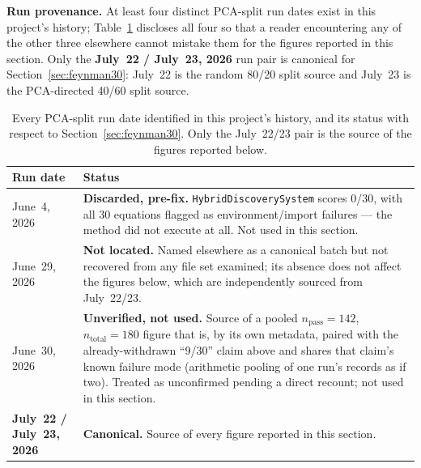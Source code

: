 \documentclass[twoside,11pt]{article}
\begin{document}
\textbf{Run provenance.}\quad
At least four distinct PCA-split run dates exist in this project's history;
Table~\ref{tab:provenance} discloses all four so that a reader encountering
any of the other three elsewhere cannot mistake them for the figures reported
in this section. Only the \textbf{July~22 / July~23, 2026} run pair is
canonical for Section~\ref{sec:feynman30}: July~22 is the random 80/20 split
source and July~23 is the PCA-directed 40/60 split source.

\begin{table}[h]
\centering
\caption{Every PCA-split run date identified in this project's history, and
  its status with respect to Section~\ref{sec:feynman30}. Only the
  July~22/23 pair is the source of the figures reported below.}
\label{tab:provenance}
\small
\begin{tabular}{lp{9.3cm}}
\toprule
Run date & Status \\
\midrule
June~4, 2026 & \textbf{Discarded, pre-fix.} \texttt{HybridDiscoverySystem}
scores 0/30, with all 30 equations flagged as environment/import failures
--- the method did not execute at all. Not used in this section. \\
June~29, 2026 & \textbf{Not located.} Named elsewhere as a canonical batch
but not recovered from any file set examined; its absence does not affect
the figures below, which are independently sourced from July~22/23. \\
June~30, 2026 & \textbf{Unverified, not used.} Source of a pooled
$n_{\text{pass}}{=}142$, $n_{\text{total}}{=}180$ figure that is, by its own
metadata, paired with the already-withdrawn ``9/30'' claim above and shares
that claim's known failure mode (arithmetic pooling of one run's records as
if two). Treated as unconfirmed pending a direct recount; not used in this
section. \\
\textbf{July~22 / July~23, 2026} & \textbf{Canonical.} Source of every
figure reported in this section. \\
\bottomrule
\end{tabular}
\end{table}
\end{document}
